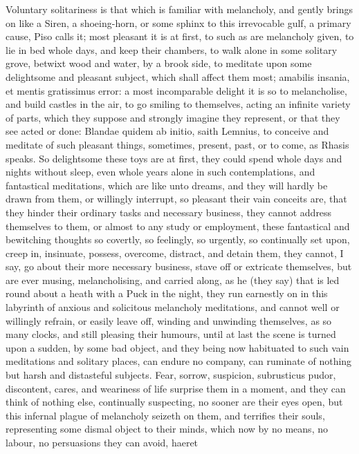 {{Voluntary solitariness is that which is familiar with melancholy, and
gently brings on like a Siren, a shoeing-horn, or some sphinx to this
irrevocable gulf, a primary cause, Piso calls it; most pleasant
it is at first, to such as are melancholy given, to lie in bed whole
days, and keep their chambers, to walk alone in some solitary grove,
betwixt wood and water, by a brook side, to meditate upon some
delightsome and pleasant subject, which shall affect them most;
amabilis insania, et mentis gratissimus error: a most incomparable
delight it is so to melancholise, and build castles in the air, to go
smiling to themselves, acting an infinite variety of parts, which they
suppose and strongly imagine they represent, or that they see acted or
done: Blandae quidem ab initio, saith Lemnius, to conceive and meditate
of such pleasant things, sometimes, present, past, or to come, as
Rhasis speaks. So delightsome these toys are at first, they could spend
whole days and nights without sleep, even whole years alone in such
contemplations, and fantastical meditations, which are like unto
dreams, and they will hardly be drawn from them, or willingly
interrupt, so pleasant their vain conceits are, that they hinder their
ordinary tasks and necessary business, they cannot address themselves
to them, or almost to any study or employment, these fantastical and
bewitching thoughts so covertly, so feelingly, so urgently, so
continually set upon, creep in, insinuate, possess, overcome, distract,
and detain them, they cannot, I say, go about their more necessary
business, stave off or extricate themselves, but are ever musing,
melancholising, and carried along, as he (they say) that is led round
about a heath with a Puck in the night, they run earnestly on in this
labyrinth of anxious and solicitous melancholy meditations, and cannot
well or willingly refrain, or easily leave off, winding and unwinding
themselves, as so many clocks, and still pleasing their humours, until
at last the scene is turned upon a sudden, by some bad object, and they
being now habituated to such vain meditations and solitary places, can
endure no company, can ruminate of nothing but harsh and distasteful
subjects. Fear, sorrow, suspicion, subrusticus pudor, discontent,
cares, and weariness of life surprise them in a moment, and they can
think of nothing else, continually suspecting, no sooner are their eyes
open, but this infernal plague of melancholy seizeth on them, and
terrifies their souls, representing some dismal object to their minds,
which now by no means, no labour, no persuasions they can avoid, haeret
}}
